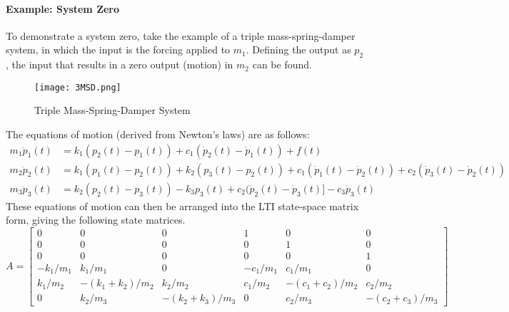 \documentclass[../notes.tex]{subfiles}
\begin{document}
\paragraph{Example: System Zero}
To demonstrate a system zero, take the example of a triple mass-spring-damper system, in which the input is the forcing applied to $m_1$. Defining the output as $p_2$, the input that results in a zero output (motion) in $m_2$ can be found.
\begin{figure}[H]
    \centering
    \texttt{[image: 3MSD.png]}
    \caption{Triple Mass-Spring-Damper System}
    \label{fig:3MSD}
\end{figure}
The equations of motion (derived from Newton's laws) are as follows:
\begin{align*} 
    m_1 \ddot{p}_1(t) &= k_1(p_2(t) - p_1(t)) + c_1(\dot{p}_2(t) - \dot{p}_1(t)) + f(t) \\
    m_2 \ddot{p}_2(t) &= k_1(p_1(t) - p_2(t)) + k_2(p_3(t) - p_2(t)) + c_1(\dot{p}_1(t) - \dot{p}_2(t)) + c_2(\dot{p}_3(t) - \dot{p}_2(t)) \\
    m_3 \ddot{p}_3(t) &= k_2(p_2(t) - p_3(t)) - k_3p_3(t) + c_2(\dot{p}_2(t) - \dot{p}_3(t)] - c_3 \dot{p}_3(t)
\end{align*}
These equations of motion can then be arranged into the LTI state-space matrix form, giving the following state matrices.
\begin{equation*} 
  A =
  \begin{bmatrix}
    0 &0 &0 &1 &0 &0 \\
    0 &0 &0 &0 &1 &0 \\
    0 &0 &0 &0 &0 &1 \\
     -k_1/m_1 &k_1/m_1 &0 &- c_1/m_1 &c_1/m_1 &0 \\
     k_1/m_2 &- (k_1 + k_2)/m_2 &k_2/m_2 &c_1/m_2 &- (c_1 + c_2)/m_2 &c_2/m_2 \\
    0 &k_2 / m_3 &- (k_2 + k_3)/m_3 &0 &c_2/m_3 &- (c_2 + c_3)/m_3
  \end{bmatrix}
\end{equation*}
\end{document}
